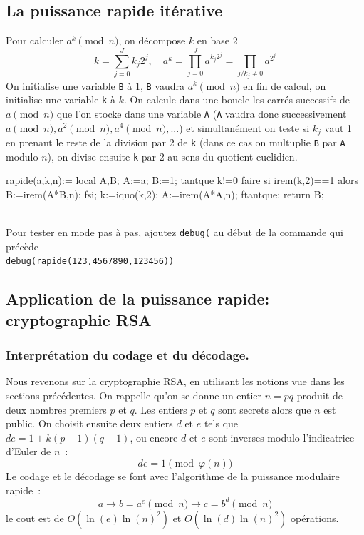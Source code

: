 \documentclass[a4paper,11pt]{book}
\begin{document}
\begin{giacjshere}
\subsection{La puissance rapide it\'erative}
Pour calculer $a^k \pmod n$, on d\'ecompose $k$ en base 2
$$ k=\sum_{j=0}^J k_j 2^j, \quad a^k = \prod_{j=0}^{J} a^{k_j 2^j} 
= \prod_{j/k_j \neq 0} a^{2^j} $$
On initialise une variable \verb|B| \`a 1, \verb|B| vaudra $a^k \pmod
n$ en fin de calcul, on initialise une variable \verb|k| \`a $k$.
On calcule dans une boucle les carr\'es successifs de $a
\pmod n$ que l'on stocke dans une variable \verb|A| (\verb|A| 
vaudra donc successivement $a \pmod n, a^2 \pmod n, a^{4} \pmod n,
...$) et simultan\'ement on teste si $k_j$ vaut 1 en prenant le reste de la
division par 2 de \verb|k| (dans ce cas on multuplie \verb|B| par
\verb|A| modulo $n$), on divise ensuite \verb|k| par 2  au sens du quotient
euclidien.
\begin{giacprog}
rapide(a,k,n):={
  local A,B;
  A:=a; B:=1;
  tantque k!=0 faire
    si irem(k,2)==1 alors B:=irem(A*B,n); fsi;
    k:=iquo(k,2);
    A:=irem(A*A,n);
  ftantque;
  return B;
}
\end{giacprog}
\\
Pour tester en mode pas \`a pas, ajoutez \verb|debug(| au
d\'ebut de la commande qui pr\'ec\`ede\\
\verb|debug(rapide(123,4567890,123456))|

\subsection{Application de la puissance rapide: cryptographie RSA}
\subsubsection{Interpr\'etation du codage et du d\'ecodage.}
Nous revenons sur la cryptographie RSA, en utilisant les notions
vue dans les sections pr\'ec\'edentes.
On rappelle qu'on se donne un entier $n=pq$ produit de deux
nombres premiers $p$ et $q$. Les entiers $p$ et $q$ sont
secrets alors que $n$ est public. On choisit ensuite deux entiers
$d$ et $e$ tels que $de=1 + k(p-1)(q-1)$, ou encore $d$ et $e$
sont inverses modulo l'indicatrice d'Euler de $n$~:
$$ de=1 \pmod {\varphi(n)} $$
Le codage et le d\'ecodage se font avec l'algorithme de la puissance
modulaire rapide~:
$$ a \rightarrow b=a^e \pmod n \rightarrow c=b^d \pmod n$$
le cout est de $O(\ln(e)\ln(n)^2)$ et $O(\ln(d)\ln(n)^2)$ op\'erations.


\end{giacjshere}
\end{document}

